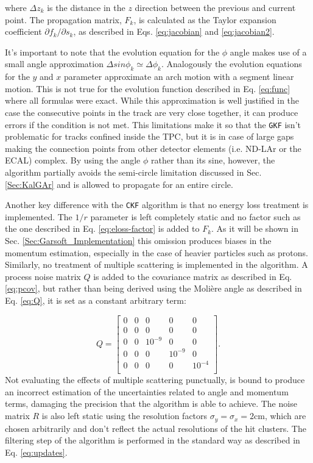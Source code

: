 where $\Delta z_k$ is the distance in the $z$ direction between the previous and current point. The propagation matrix, $F_k$, is calculated as the Taylor expansion coefficient $\partial f_k/ \partial s_k$, as described in Eqs. \ref{eq:jacobian} and \ref{eq:jacobian2}.

It's important to note that the evolution equation for the $\phi$ angle makes use of a small angle approximation $\Delta sin\phi_k\simeq \Delta \phi_k$. Analogously the evolution equations for the $y$ and $x$ parameter approximate an arch motion with a segment linear motion. This is not true for the evolution function described in Eq. \ref{eq:func} where all formulas were exact. While this approximation is well justified in the case the consecutive points in the track are very close together, it can produce errors if the condition is not met. This limitations make it so that the \texttt{GKF} isn't problematic for tracks confined inside the TPC, but it is in case of large gaps making the connection points from other detector elements (i.e. ND-LAr or the ECAL) complex. By using the angle $\phi$ rather than its sine, however, the algorithm partially avoids the semi-circle limitation discussed in Sec. \ref{Sec:KalGAr} and is allowed to propagate for an entire circle. 

Another key difference with the \texttt{CKF} algorithm is that no energy loss treatment is implemented. The $1/r$ parameter is left completely static and no factor such as the one described in Eq. \ref{eq:eloss-factor} is added to $F_k$. As it will be shown in Sec. \ref{Sec:Garsoft_Implementation} this omission produces biases in the momentum estimation, especially in the case of heavier particles such as protons. Similarly, no treatment of multiple scattering is implemented in the algorithm. A process noise matrix $Q$ is added to the covariance matrix as described in Eq. \ref{eq:pcov}, but rather than being derived using the Molière angle as described in Eq. \ref{eq:Q}, it is set as a constant arbitrary term:

\begin{equation}\label{eq:Q2}
    Q =\begin{bmatrix}
    0 & 0 & 0 & 0& 0 \\
    0 & 0 & 0 & 0& 0 \\
    0 & 0 & 10^{-9} & 0& 0 \\
    0 & 0 & 0 & 10^{-9}& 0 \\
    0 & 0 & 0 & 0& 10^{-4} \\
    \end{bmatrix} .
\end{equation}
Not evaluating the effects of multiple scattering punctually, is bound to produce an incorrect estimation of the uncertainties related to angle and momentum terms, damaging the precision that the algorithm is able to achieve. The noise matrix $R$ is also left static using the resolution factors $\sigma_y=\sigma_x=2 \text{cm}$, which are chosen arbitrarily and don't reflect the actual resolutions of the hit clusters. The filtering step of the algorithm is performed in the standard way as described in Eq. \ref{eq:updates}.

